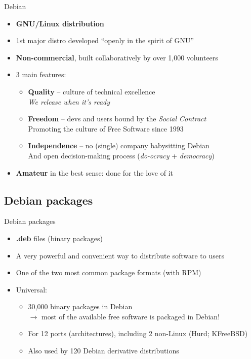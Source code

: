 \documentclass[10pt,final]{beamer}
\begin{document}
\begin{frame}{Debian}
	\begin{itemize}
		\item \textbf{GNU/Linux distribution}
			\br
		\item 1st major distro developed ``openly in the spirit of GNU''
			\br
		\item \textbf{Non-commercial}, built collaboratively by over 1,000 volunteers
			\br
		\item 3 main features:
			\begin{itemize}
				\item \textbf{Quality} -- culture of technical excellence\\
					{\small\sl We release when it's ready}
					\hbr
				\item \textbf{Freedom} -- devs and users bound by the \textsl{Social Contract}\\
					Promoting the culture of Free Software since 1993
					\hbr
				\item \textbf{Independence} -- no (single) company babysitting Debian\\
					And open decision-making process (\textsl{do-ocracy} + \textsl{democracy})
			\end{itemize}
                        \br
                \item \textbf{Amateur} in the best sense: done for the love of it
	\end{itemize}
\end{frame}

\subsection{Debian packages}
\begin{frame}{Debian packages}
\begin{itemize}
\item \textbf{.deb} files (binary packages)
	\br
\item A very powerful and convenient way to distribute software to users
	\br
\item One of the two most common package formats (with RPM)
	\br
\item Universal:
	\begin{itemize}
		\item 30,000 binary packages in Debian\\
			$\rightarrow$ most of the available free software is packaged in Debian!
			\hbr
		\item For 12 ports (architectures), including 2 non-Linux (Hurd; KFreeBSD)
			\hbr
		\item Also used by 120 Debian derivative distributions
	\end{itemize}
\end{itemize}
\end{frame}
\end{document}
